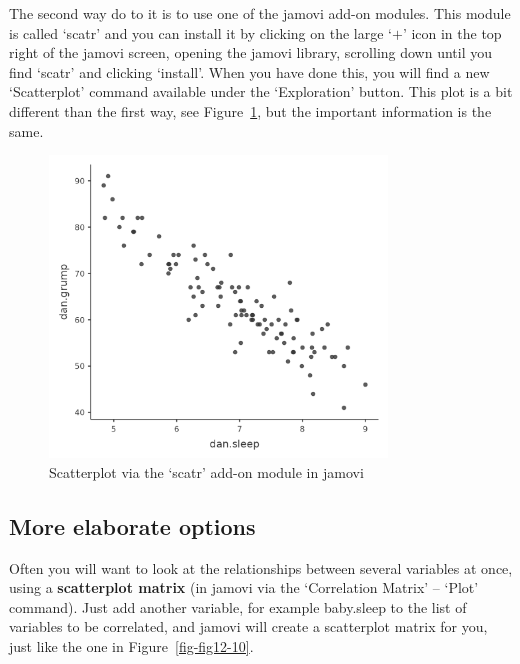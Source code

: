 \documentclass[
  a4paper,
]{book}
\begin{document}
The second way do to it is to use one of the jamovi add-on modules. This
module is called `scatr' and you can install it by clicking on the large
`\(+\)' icon in the top right of the jamovi screen, opening the jamovi
library, scrolling down until you find `scatr' and clicking `install'.
When you have done this, you will find a new `Scatterplot' command
available under the `Exploration' button. This plot is a bit different
than the first way, see Figure~\ref{fig-fig12-9}, but the important
information is the same.

\begin{figure}[h!]

\includegraphics[width=0.8\textwidth,height=\textheight]{images/fig12-9.png} \hfill{}

\caption{\label{fig-fig12-9}Scatterplot via the `scatr' add-on module in
jamovi}

\end{figure}

\hypertarget{more-elaborate-options}{%
\subsection{More elaborate options}\label{more-elaborate-options}}

Often you will want to look at the relationships between several
variables at once, using a \textbf{scatterplot matrix} (in jamovi via
the `Correlation Matrix' -- `Plot' command). Just add another variable,
for example baby.sleep to the list of variables to be correlated, and
jamovi will create a scatterplot matrix for you, just like the one in
Figure~\ref{fig-fig12-10}.
\end{document}
